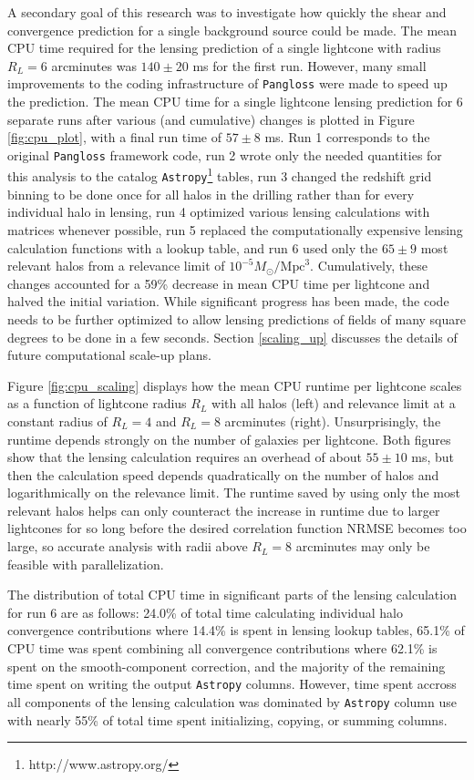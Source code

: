 \documentclass[%
 reprint,
 amsmath,amssymb,
 aps,nofootinbib
]{revtex4-1}
\begin{document}
A secondary goal of this research was to investigate how quickly the shear and convergence prediction for a single background source could be made. The mean CPU time required for the lensing prediction of a single lightcone with radius $R_L=6$ arcminutes was ${140\pm20}$ ms for the first run. However, many small improvements to the coding infrastructure of \texttt{Pangloss} were made to speed up the prediction. The mean CPU time for a single lightcone lensing prediction for 6 separate runs after various (and cumulative) changes is plotted in Figure \ref{fig:cpu_plot}, with a final run time of $57\pm8$ ms. Run 1 corresponds to the original \texttt{Pangloss} framework code, run 2 wrote only the needed quantities for this analysis to the catalog \texttt{Astropy}\footnote{http://www.astropy.org/} tables, run 3 changed the redshift grid binning to be done once for all halos in the drilling rather than for every individual halo in lensing, run 4 optimized various lensing calculations with matrices whenever possible, run 5 replaced the computationally expensive lensing calculation functions with a lookup table, and run 6 used only the ${65\pm9}$ most relevant halos from a relevance limit of ${10^{-5}M_\odot/\text{Mpc}^3}$. Cumulatively, these changes accounted for a 59\% decrease in mean CPU time per lightcone and halved the initial variation. While significant progress has been made, the code needs to be further optimized to allow lensing predictions of fields of many square degrees to be done in a few seconds. Section \ref{scaling_up} discusses the details of future computational scale-up plans.

Figure \ref{fig:cpu_scaling} displays how the mean CPU runtime per lightcone scales as a function of lightcone radius $R_L$ with all halos (left) and relevance limit at a constant radius of $R_L=4$ and $R_L=8$ arcminutes (right). Unsurprisingly, the runtime depends strongly on the number of galaxies per lightcone. Both figures show that the lensing calculation requires an overhead of about ${55\pm10}$ ms, but then the calculation speed depends quadratically on the number of halos and logarithmically on the relevance limit. The runtime saved by using only the most relevant halos helps can only counteract the increase in runtime due to larger lightcones for so long before the desired correlation function NRMSE becomes too large, so accurate analysis with radii above $R_L=8$ arcminutes may only be feasible with parallelization.

The distribution of total CPU time in significant parts of the lensing calculation for run 6 are as follows: 24.0\% of total time calculating individual halo convergence contributions where 14.4\% is spent in lensing lookup tables, 65.1\% of CPU time was spent combining all convergence contributions where 62.1\% is spent on the smooth-component correction, and the majority of the remaining time spent on writing the output \texttt{Astropy} columns. However, time spent accross all components of the lensing calculation was dominated by \texttt{Astropy} column use with nearly 55\% of total time spent initializing, copying, or summing columns.
\end{document}
